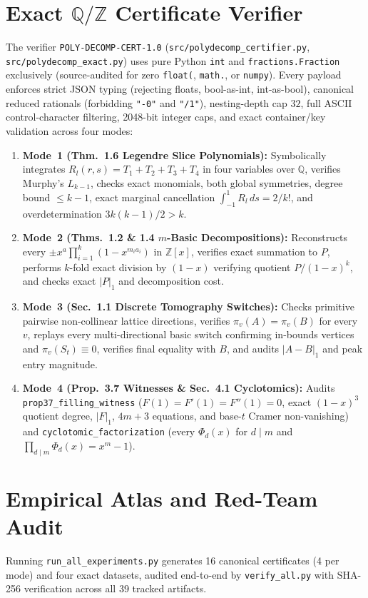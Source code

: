 \documentclass[10pt,twocolumn]{article}
\begin{document}
\section{Exact \texorpdfstring{$\mathbb{Q}/\mathbb{Z}$}{Q/Z} Certificate Verifier}\label{sec:cert}
The verifier \texttt{POLY-DECOMP-CERT-1.0} (\texttt{src/polydecomp\_certifier.py}, \texttt{src/polydecomp\_exact.py}) uses pure Python \texttt{int} and \texttt{fractions.Fraction} exclusively (source-audited for zero \texttt{float(}, \texttt{math.}, or \texttt{numpy}). Every payload enforces strict JSON typing (rejecting floats, bool-as-int, int-as-bool), canonical reduced rationals (forbidding \texttt{"-0"} and \texttt{"/1"}), nesting-depth cap $32$, full ASCII control-character filtering, 2048-bit integer caps, and exact container/key validation across four modes:
\begin{enumerate}[leftmargin=*,nosep]
  \item \textbf{Mode~1 (Thm.~1.6 Legendre Slice Polynomials):} Symbolically integrates $R_l(r,s) = T_1 + T_2 + T_3 + T_4$ in four variables over $\mathbb{Q}$, verifies Murphy's $L_{k-1}$, checks exact monomials, both global symmetries, degree bound $\le k-1$, exact marginal cancellation $\int_{-1}^1 R_l\,ds = 2/k!$, and overdetermination $3k(k-1)/2 > k$.
  \item \textbf{Mode~2 (Thms.~1.2 \& 1.4 $m$-Basic Decompositions):} Reconstructs every $\pm x^a \prod_{i=1}^k(1-x^{m_i a_i})$ in $\mathbb{Z}[x]$, verifies exact summation to $P$, performs $k$-fold exact division by $(1-x)$ verifying quotient $P/(1-x)^k$, and checks exact $|P|_1$ and decomposition cost.
  \item \textbf{Mode~3 (Sec.~1.1 Discrete Tomography Switches):} Checks primitive pairwise non-collinear lattice directions, verifies $\pi_v(A) = \pi_v(B)$ for every $v$, replays every multi-directional basic switch confirming in-bounds vertices and $\pi_v(S_t) \equiv 0$, verifies final equality with $B$, and audits $|A-B|_1$ and peak entry magnitude.
  \item \textbf{Mode~4 (Prop.~3.7 Witnesses \& Sec.~4.1 Cyclotomics):} Audits \texttt{prop37\_filling\_witness} ($F(1)=F'(1)=F''(1)=0$, exact $(1-x)^3$ quotient degree, $|F|_1$, $4m+3$ equations, and base-$t$ Cramer non-vanishing) and \texttt{cyclotomic\_factorization} (every $\Phi_d(x)$ for $d \mid m$ and $\prod_{d\mid m}\Phi_d(x) = x^m - 1$).
\end{enumerate}

\section{Empirical Atlas and Red-Team Audit}\label{sec:results}
Running \texttt{run\_all\_experiments.py} generates 16 canonical certificates (4 per mode) and four exact datasets, audited end-to-end by \texttt{verify\_all.py} with SHA-256 verification across all 39 tracked artifacts.
\end{document}
